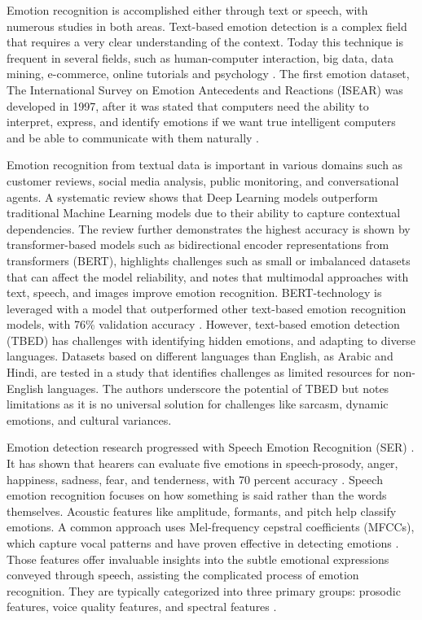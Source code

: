 Emotion recognition is accomplished either through text or speech, with numerous studies in both areas. Text-based emotion detection is a complex field that requires a very clear understanding of the context. Today this technique is frequent in several fields, such as human-computer interaction, big data, data mining, e-commerce, online tutorials and psychology \autocite{Madhuri2021}. The first emotion dataset, The International Survey on Emotion Antecedents and Reactions (ISEAR) was developed in 1997, after it was stated that computers need the ability to interpret, express, and identify emotions if we want true intelligent computers and be able to communicate with them naturally \autocite{Kusal2023}.

Emotion recognition from textual data is important in various domains such as customer reviews, social media analysis, public monitoring, and conversational agents. A systematic review \autocite{Kusal2023} shows that Deep Learning models outperform traditional Machine Learning models due to their ability to capture contextual dependencies. The review further demonstrates the highest accuracy is shown by transformer-based models such as bidirectional encoder representations from transformers (BERT), highlights challenges such as small or imbalanced datasets that can affect the model reliability, and notes that multimodal approaches with text, speech, and images improve emotion recognition. BERT-technology is leveraged with a model that outperformed other text-based emotion recognition models, with 76\% validation accuracy \autocite{Madhuri2021}. However, text-based emotion detection (TBED) has challenges with identifying hidden emotions, and adapting to diverse languages. Datasets based on different languages than English, as Arabic and Hindi, are tested in a study \autocite{Maruf2024} that identifies challenges as limited resources for non-English languages. The authors underscore the potential of TBED but notes limitations as it is no universal solution for challenges like sarcasm, dynamic emotions, and cultural variances.

Emotion detection research progressed with Speech Emotion Recognition (SER) \autocite{Kusal2023}. It has shown that hearers can evaluate five emotions in speech-prosody, anger, happiness, sadness, fear, and tenderness, with 70 percent accuracy \autocite{Oatley2019}. Speech emotion recognition focuses on how something is said rather than the words themselves. Acoustic features like amplitude, formants, and pitch help classify emotions. A common approach uses Mel-frequency cepstral coefficients (MFCCs), which capture vocal patterns and have proven effective in detecting emotions \autocite{Thaler2024}. Those features offer invaluable insights into the subtle emotional expressions conveyed through speech, assisting the complicated process of emotion recognition. They are typically categorized into three primary groups: prosodic features, voice quality features, and spectral features \autocite{Lian2023}.

